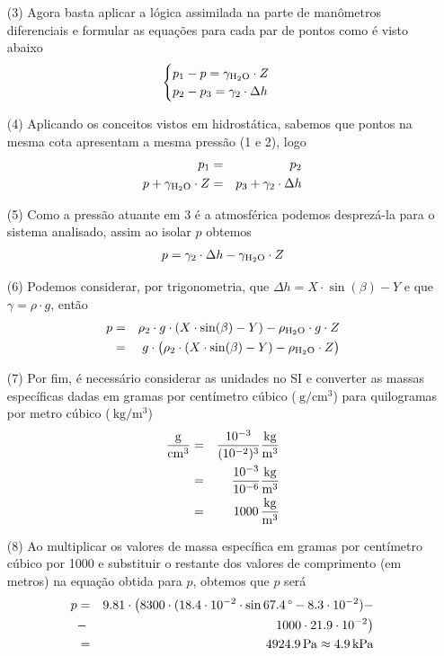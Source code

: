 \documentclass[
	a4paper,
	12pt,
	brazilian
]{article}
\begin{document}
\begin{enumerate}
\begin{center}
		\end{center}
		\item[(3)] Agora basta aplicar a lógica assimilada na parte de manômetros diferenciais e formular as equações para cada par de pontos como é visto abaixo
		$$
		\begin{cases}
			p_{1}-p=\gamma_{\ce{H2O}}\cdot Z\\
			p_{2}-p_{3}=\gamma_{2}\cdot\Delta h
		\end{cases}
		$$
		\item[(4)] Aplicando os conceitos vistos em hidrostática, sabemos que pontos na mesma cota apresentam a mesma pressão (1 e 2), logo
		\begin{eqnarray}
			p_{1}&=&p_{2}\\
			p+\gamma_{\ce{H2O}}\cdot Z&=&p_{3}+\gamma_{2}\cdot\Delta h
		\end{eqnarray}
		\item[(5)] Como a pressão atuante em 3 é a atmosférica podemos desprezá-la para o sistema analisado, assim ao isolar $p$ obtemos
		\begin{eqnarray}
			p=\gamma_{2}\cdot\Delta h-\gamma_{\ce{H2O}}\cdot Z
		\end{eqnarray}
		\item[(6)] Podemos considerar, por trigonometria, que $\Delta h=X\cdot\sin (\beta)-Y$ e que $\gamma=\rho\cdot g$, então
		\begin{eqnarray}
			p&=&\rho_{2}\cdot g\cdot (X\cdot\sin(\beta)-Y)-\rho_{\ce{H2O}}\cdot g\cdot Z\\
			&=&g\cdot\big(\rho_{2}\cdot (X\cdot\sin(\beta)-Y)-\rho_{\ce{H2O}}\cdot Z\big)
		\end{eqnarray}
		\item[(7)] Por fim, é necessário considerar as unidades no SI e converter as massas específicas dadas em gramas por centímetro cúbico ($\SI{}{\gram/\centi\meter^{3}}$) para quilogramas por metro cúbico ($\SI{}{\kilogram/\meter^{3}}$)
		\begin{eqnarray}
			\SI{}{\dfrac{\gram}{\centi\meter^{3}}}&=&\dfrac{10^{-3}}{(10^{-2})^{3}}\SI{}{\dfrac{\kilogram}{\meter^{3}}}\\
			&=&\dfrac{10^{-3}}{10^{-6}}\SI{}{\dfrac{\kilogram}{\meter^{3}}}\\
			&=&\SI{1000}{\dfrac{\kilogram}{\meter^{3}}}
		\end{eqnarray}
		\item[(8)] Ao multiplicar os valores de massa específica em gramas por centímetro cúbico por 1000 e substituir o restante dos valores de comprimento (em metros) na equação obtida para $p$, obtemos que $p$ será
		\begin{eqnarray}
			p&=&9.81\cdot\big(8300\cdot(18.4\cdot 10^{-2}\cdot\sin\SI{67.4}{\SIUnitSymbolDegree}-8.3\cdot 10^{-2})-\\
			&-&1000\cdot 21.9\cdot 10^{-2}\big)\\
			&=&\SI{4924.9}{\pascal}\approx\SI{4.9}{\kilo\pascal}
		\end{eqnarray}
	\end{enumerate}
\end{document}
